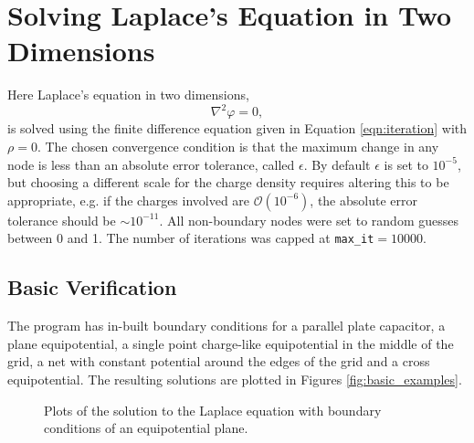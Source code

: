 \section{Solving Laplace's Equation in Two Dimensions}
\label{sec:laplace}

Here Laplace's equation in two dimensions,
\begin{equation}
    \nabla^2 \varphi = 0,
\end{equation}
is solved using the finite difference equation given in Equation \ref{eqn:iteration} with $\rho = 0$. The chosen convergence condition is that the maximum change in any node is less than an absolute error tolerance, called $\epsilon$. By default $\epsilon$ is set to $10^{-5}$, but choosing a different scale for the charge density requires altering this to be appropriate, e.g. if the charges involved are $\mathcal{O}(10^{-6})$, the absolute error tolerance should be $\sim 10^{-11}$. All non-boundary nodes were set to random guesses between 0 and 1. The number of iterations was capped at \texttt{max\_it}$=10000$.

\subsection{Basic Verification}
\label{subsec:basic_verification}

The program has in-built boundary conditions for a parallel plate capacitor, a plane equipotential, a single point charge-like equipotential in the middle of the grid, a net with constant potential around the edges of the grid and a cross equipotential. The resulting solutions are plotted in Figures \ref{fig:basic_examples}.

\begin{figure}
    \centering
    \caption{Plots of the solution to the Laplace equation with boundary conditions of an equipotential plane.}
    \label{fig:plane}
\end{figure}

